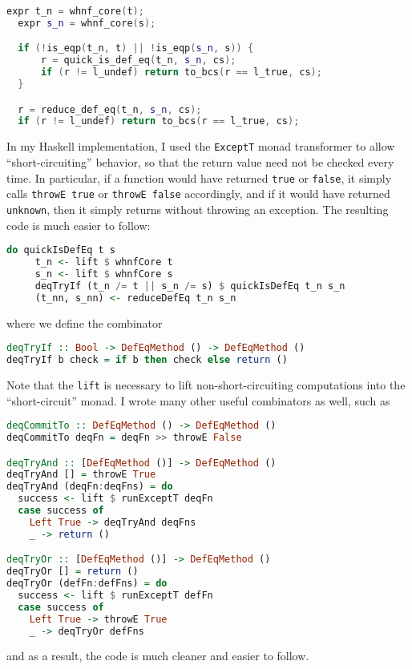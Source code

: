 \documentclass{article}
\begin{document}
\begin{spacing}{1.1}
\begin{lstlisting}[language=C++]
  expr t_n = whnf_core(t);
  expr s_n = whnf_core(s);

  if (!is_eqp(t_n, t) || !is_eqp(s_n, s)) {
      r = quick_is_def_eq(t_n, s_n, cs);
      if (r != l_undef) return to_bcs(r == l_true, cs);
  }

  r = reduce_def_eq(t_n, s_n, cs);
  if (r != l_undef) return to_bcs(r == l_true, cs);
\end{lstlisting}

In my Haskell implementation, I used the \lstinline{ExceptT} monad transformer to allow ``short-circuiting'' behavior, so that the return value need not be checked every time. In particular, if a function would have returned \lstinline{true} or \lstinline{false}, it simply calls \lstinline{throwE true} or \lstinline{throwE false} accordingly, and if it would have returned \lstinline{unknown}, then it simply returns without throwing an exception. The resulting code is much easier to follow:

\begin{lstlisting}[language=Haskell]
  do quickIsDefEq t s
     t_n <- lift $ whnfCore t
     s_n <- lift $ whnfCore s
     deqTryIf (t_n /= t || s_n /= s) $ quickIsDefEq t_n s_n
     (t_nn, s_nn) <- reduceDefEq t_n s_n
\end{lstlisting}

where we define the combinator
\begin{lstlisting}[language=Haskell]
deqTryIf :: Bool -> DefEqMethod () -> DefEqMethod ()
deqTryIf b check = if b then check else return ()
\end{lstlisting}

Note that the \lstinline{lift} is necessary to lift non-short-circuiting computations into the ``short-circuit'' monad. I wrote many other useful combinators as well, such as
\begin{lstlisting}[language=Haskell]
deqCommitTo :: DefEqMethod () -> DefEqMethod ()
deqCommitTo deqFn = deqFn >> throwE False

deqTryAnd :: [DefEqMethod ()] -> DefEqMethod ()
deqTryAnd [] = throwE True
deqTryAnd (deqFn:deqFns) = do
  success <- lift $ runExceptT deqFn
  case success of
    Left True -> deqTryAnd deqFns
    _ -> return ()

deqTryOr :: [DefEqMethod ()] -> DefEqMethod ()
deqTryOr [] = return ()
deqTryOr (defFn:defFns) = do
  success <- lift $ runExceptT defFn
  case success of
    Left True -> throwE True
    _ -> deqTryOr defFns
\end{lstlisting}
and as a result, the code is much cleaner and easier to follow.


\end{spacing}
\end{document}

